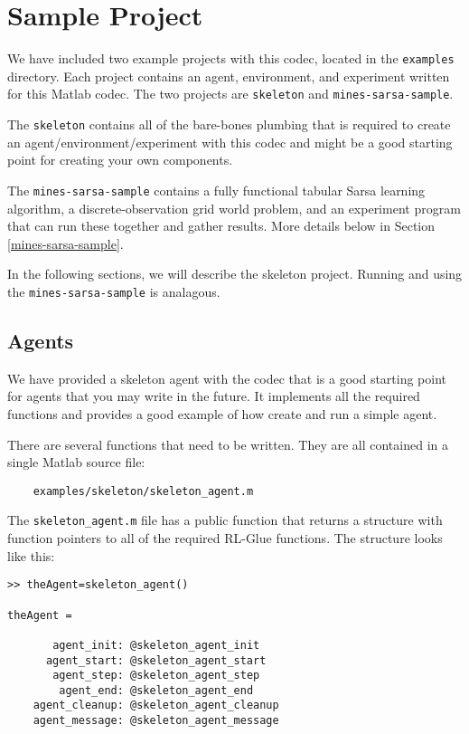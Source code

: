 \documentclass[11pt]{article}
\begin{document}
\section{Sample Project}
We have included two example projects with this codec, located in the \texttt{examples} directory.  Each project contains an agent, environment, and experiment written for this Matlab codec.  The two projects are \texttt{skeleton} and \texttt{mines-sarsa-sample}.

The \texttt{skeleton} contains all of the bare-bones plumbing that is required to create an agent/environment/experiment with this codec and might be a good starting point for creating your own components.

The \texttt{mines-sarsa-sample} contains a fully functional tabular Sarsa learning algorithm, a discrete-observation grid world problem, and an experiment program that can run these together and gather results.  More details below in Section \ref{mines-sarsa-sample}.

In the following sections, we will describe the skeleton project.  Running and using the \texttt{mines-sarsa-sample} is analagous.

\subsection{Agents}
\label{sec:agent}
We have provided a skeleton agent with the codec that is a good starting point for agents that you may write in the future.
It implements all the required functions and provides a good example of how create and run a simple agent.

There are several functions that need to be written. They are all contained in a single Matlab source file:
\begin{verbatim}
	examples/skeleton/skeleton_agent.m
\end{verbatim}

The \texttt{skeleton\_agent.m} file has a public function that returns a structure with function pointers to all of the required RL-Glue functions.  The structure looks like this:

\begin{verbatim}
>> theAgent=skeleton_agent()

theAgent = 

       agent_init: @skeleton_agent_init
      agent_start: @skeleton_agent_start
       agent_step: @skeleton_agent_step
        agent_end: @skeleton_agent_end
    agent_cleanup: @skeleton_agent_cleanup
    agent_message: @skeleton_agent_message
\end{verbatim}
\end{document}
